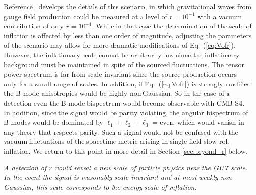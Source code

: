 Reference~\cite{Namba:2015gja} develops the details of this scenario, in which gravitational waves from gauge field production could be measured at a level of $r=10^{-1}$ with a vacuum contribution of only $r=10^{-4}$. While in that case the determination of the scale of inflation is affected by less than one order of magnitude, adjusting the parameters of the scenario may allow for more dramatic modifications of Eq.~(\ref{eq:Vofr}). However, the inflationary scale cannot be arbitrarily low since the inflationary background must be maintained in spite of the sourced fluctuations. The tensor power spectrum is far from scale-invariant since the source production occurs only for a small range of scales. In addition, if Eq.~(\ref{eq:Vofr}) is strongly modified the B-mode anisotropies would be highly non-Gaussian. So in the case of a detection even the B-mode bispectrum would become observable with CMB-S4. In addition, since the signal would be parity violating, the angular bispectrum of B-modes would be dominated by $\ell_1+\ell_2+\ell_3=$even, which would vanish in any theory that respects parity. Such a signal would not be confused with the vacuum fluctuations of the spacetime metric arising in single field slow-roll inflation. We return to this point in more detail in Section \ref{sec:beyond_r} below.


{\it A detection of $r$ would reveal a new scale of particle physics near the GUT scale. In the event the signal is reasonably scale-invariant and at most weakly non-Gaussian, this scale corresponds to the energy scale of inflation. }


